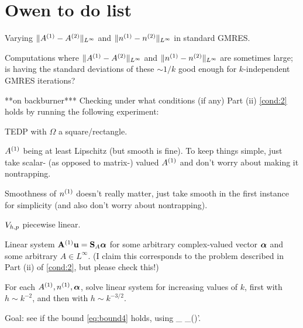 \section*{Owen to do list}
\ben
\item Varying  $\|{A}^{(1)}-{A}^{(2)}\|_{L^\infty}$ and $\|{n}^{(1)}-{n}^{(2)}\|_{L^\infty}$ in standard GMRES.
\item Computations where $\|{A}^{(1)}-{A}^{(2)}\|_{L^\infty}$ and $\|{n}^{(1)}-{n}^{(2)}\|_{L^\infty}$ are sometimes large; is having the standard deviations of these $\sim 1/k$ good enough for $k$-independent GMRES iterations?
\item ***on backburner*** Checking under what conditions (if any) Part (ii) \cref{cond:2} holds by running the following experiment:
\bit
\item TEDP with $\Omega$ a square/rectangle.
\item ${A}^{(1)}$ being at least Lipschitz (but smooth is fine). To keep things simple, just take scalar- (as opposed to matrix-) valued ${A}^{(1)}$ and don't worry about making it nontrapping.
\item Smoothness of ${n}^{(1)}$ doesn't really matter, just take smooth in the first instance for simplicity (and also don't worry about nontrapping).
\item $V_{h,p}$ piecewise linear.
\item Linear system $\mathbf{A}^{(1)} \mathbf{u} = \mathbf{S}_{A} {\boldsymbol{\alpha}}$ for some arbitrary complex-valued vector ${\boldsymbol{\alpha}}$ and some arbitrary $A\in L^\infty$. (I claim this corresponds to the problem described in Part (ii) of \cref{cond:2},  but please check this!)
\item For each ${A}^{(1)}, {n}^{(1)}, {\boldsymbol{\alpha}}$, solve linear system for increasing values of $k$, first with $h\sim k^{-2}$, and then with $h\sim k^{-3/2}$.
\item Goal: see if the bound \cref{eq:bound4} holds, using 
\beqs
{}_{\LtDR} \quad {} \quad {}_{(\HokDR)'}.
\eeqs
\eit
\een

